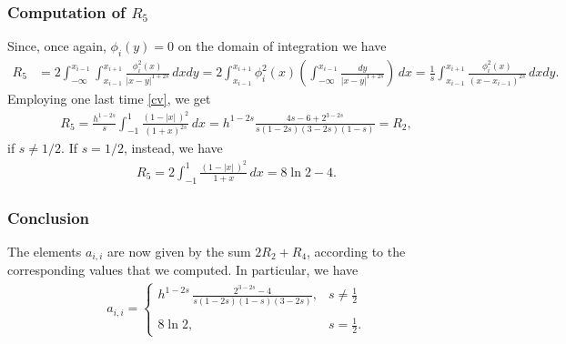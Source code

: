 {\subsubsection*{Computation of $R_5$}
Since, once again, $\phi_i(y) = 0$ on the domain of integration we have
\begin{align*}
	R_5 &= 2\int_{-\infty}^{x_{i-1}}\int_{x_{i-1}}^{x_{i+1}} \frac{\phi_i^2(x)}{|x-y|^{1+2s}}\,dxdy = 2\int_{x_{i-1}}^{x_{i+1}}\phi_i^2(x)\left(\int_{-\infty}^{x_{i-1}} \frac{dy}{|x-y|^{1+2s}}\right)\,dx = \frac{1}{s}\int_{x_{i-1}}^{x_{i+1}}\frac{\phi_i^2(x)}{(x-x_{i-1})^{2s}}\,dxdy.
\end{align*}
Employing one last time \eqref{cv}, we get
\begin{align*}
	R_5 = \frac{h^{1-2s}}{s}\int_{-1}^1 \frac{(1-|x|\,)^2}{(1+x)^{2s}}\,dx = h^{1-2s}\frac{4s-6+2^{3-2s}}{s(1-2s)(3-2s)(1-s)}=R_2,
\end{align*}
if $s\neq 1/2$. If $s=1/2$, instead, we have
\begin{align*}
	R_5 = 2\int_{-1}^1 \frac{(1-|x|\,)^2}{1+x}\,dx = 8\ln 2-4.
\end{align*}

\subsubsection*{Conclusion}
The elements $a_{i,i}$ are now given by the sum $2R_2+R_4$, according to the corresponding values that we computed. In particular, we have 
\begin{align*}
	a_{i,i} = \begin{cases}
			\displaystyle h^{1-2s}\,\frac{2^{3-2s}-4}{s(1-2s)(1-s)(3-2s)}, & \displaystyle s\neq\frac{1}{2}
			\\
			\\
			8\ln 2, & \displaystyle s=\frac{1}{2}.			
			\end{cases}	
\end{align*}

}